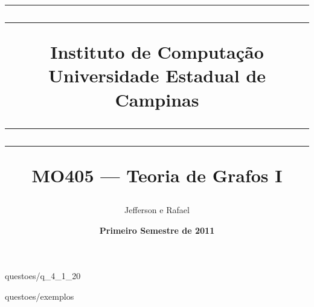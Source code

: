 \documentclass[10pt]{article}
\title{ {\footnotesize
	\hrule\vspace{1pt}\hrule\vspace{1ex}
		Instituto de Computação \hfill Universidade Estadual de Campinas
	\smallskip 
	\hrule\vspace{1pt}\hrule}\vspace{10pt}
		MO405 --- Teoria de Grafos I \\[-6pt]
	\author{Jefferson e Rafael} 
}
\date{\bf Primeiro Semestre de 2011}
\begin{document}
 
\maketitle
\vspace{0.5cm}
\thispagestyle{empty}


 {questoes/q_4_1_20}

 {questoes/exemplos}
\end{document}
